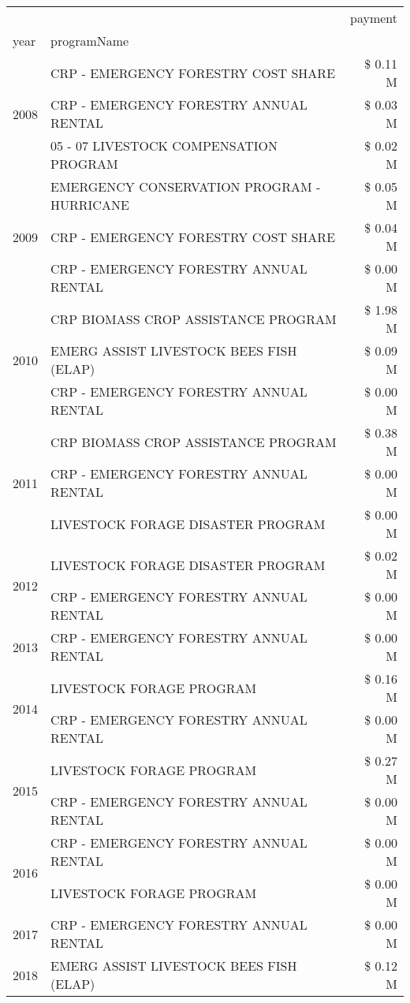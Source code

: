 \begin{tabular}{llr}
\toprule
 &  & payment \\
year & programName &  \\
\midrule
\multirow[t]{3}{*}{2008} & CRP - EMERGENCY FORESTRY COST SHARE & \$ 0.11 M \\
 & CRP - EMERGENCY FORESTRY ANNUAL RENTAL & \$ 0.03 M \\
 & 05 - 07 LIVESTOCK COMPENSATION PROGRAM & \$ 0.02 M \\
\cline{1-3}
\multirow[t]{3}{*}{2009} & EMERGENCY CONSERVATION PROGRAM - HURRICANE & \$ 0.05 M \\
 & CRP - EMERGENCY FORESTRY COST SHARE & \$ 0.04 M \\
 & CRP - EMERGENCY FORESTRY ANNUAL RENTAL & \$ 0.00 M \\
\cline{1-3}
\multirow[t]{3}{*}{2010} & CRP BIOMASS CROP ASSISTANCE PROGRAM & \$ 1.98 M \\
 & EMERG ASSIST LIVESTOCK BEES FISH (ELAP) & \$ 0.09 M \\
 & CRP - EMERGENCY FORESTRY ANNUAL RENTAL & \$ 0.00 M \\
\cline{1-3}
\multirow[t]{3}{*}{2011} & CRP BIOMASS CROP ASSISTANCE PROGRAM & \$ 0.38 M \\
 & CRP - EMERGENCY FORESTRY ANNUAL RENTAL & \$ 0.00 M \\
 & LIVESTOCK FORAGE DISASTER PROGRAM & \$ 0.00 M \\
\cline{1-3}
\multirow[t]{2}{*}{2012} & LIVESTOCK FORAGE DISASTER PROGRAM & \$ 0.02 M \\
 & CRP - EMERGENCY FORESTRY ANNUAL RENTAL & \$ 0.00 M \\
\cline{1-3}
2013 & CRP - EMERGENCY FORESTRY ANNUAL RENTAL & \$ 0.00 M \\
\cline{1-3}
\multirow[t]{2}{*}{2014} & LIVESTOCK FORAGE PROGRAM & \$ 0.16 M \\
 & CRP - EMERGENCY FORESTRY ANNUAL RENTAL & \$ 0.00 M \\
\cline{1-3}
\multirow[t]{2}{*}{2015} & LIVESTOCK FORAGE PROGRAM & \$ 0.27 M \\
 & CRP - EMERGENCY FORESTRY ANNUAL RENTAL & \$ 0.00 M \\
\cline{1-3}
\multirow[t]{2}{*}{2016} & CRP - EMERGENCY FORESTRY ANNUAL RENTAL & \$ 0.00 M \\
 & LIVESTOCK FORAGE PROGRAM & \$ 0.00 M \\
\cline{1-3}
2017 & CRP - EMERGENCY FORESTRY ANNUAL RENTAL & \$ 0.00 M \\
\cline{1-3}
\multirow[t]{2}{*}{2018} & EMERG ASSIST LIVESTOCK BEES FISH (ELAP) & \$ 0.12 M \\

\end{tabular}
